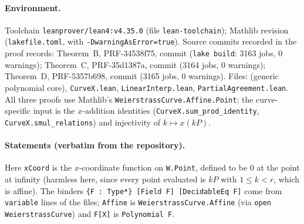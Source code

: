 \documentclass[11pt,a4paper]{article}
\theoremstyle{remark}
\begin{document}
\paragraph{Environment.} Toolchain \texttt{leanprover/lean4:v4.35.0} (file \texttt{lean-toolchain}); Mathlib revision
 (\texttt{lakefile.toml}, with \texttt{-DwarningAsError=true}). Source commits
recorded in the proof records:
Theorem~B, \mbox{PRF-34538f75}, commit  (\texttt{lake build}: 3163 jobs, 0 warnings);
Theorem~C, \mbox{PRF-35d1387a}, commit  (3164 jobs, 0 warnings);
Theorem~D, \mbox{PRF-5357b698}, commit  (3165 jobs, 0 warnings).
Files:  (generic polynomial core), \texttt{CurveX.lean},
\texttt{LinearInterp.lean}, \texttt{PartialAgreement.lean}. All three proofs use Mathlib's
\texttt{WeierstrassCurve.Affine.Point}; the curve-specific input is the $x$-addition identities
(\texttt{CurveX.sum\_prod\_identity}, \texttt{CurveX.smul\_relations}) and injectivity of $k\mapsto x(kP)$.

\paragraph{Statements (verbatim from the repository).} Here \texttt{xCoord} is the $x$-coordinate function on \texttt{W.Point}, defined to be $0$ at the point at infinity (harmless here, since every point evaluated is $kP$ with $1\le k<r$, which is affine). The binders \texttt{\{F : Type*\} [Field F] [DecidableEq F]} come from \texttt{variable} lines of the files; \texttt{Affine} is \texttt{WeierstrassCurve.Affine} (via \texttt{open WeierstrassCurve}) and \texttt{F[X]} is \texttt{Polynomial F}.
\end{document}
